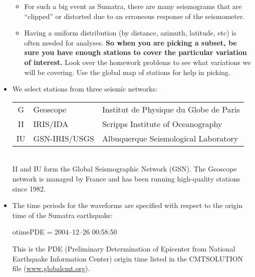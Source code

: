\documentclass[11pt,titlepage,fleqn]{article}
\begin{document}
\begin{itemize}
\begin{itemize}
\item For such a big event as Sumatra, there are many seismograms that are ``clipped'' or distorted due to an erroneous response of the seismometer.

\item Having a uniform distribution (by distance, azimuth, latitude, etc) is often needed for analyses. {\bf So when you are picking a subset, be sure you have enough stations to cover the particular variation of interest.} Look over the homework problems to see what variations we will be covering. Use the global map of stations for help in picking.
\end{itemize}

\item We select stations from three seismic networks: \\

\begin{tabular}{cll}
\hline
G   & Geoscope      & Institut de Physique du Globe de Paris \\
II  & IRIS/IDA      & Scripps Institute of Oceanography \\
IU  & GSN-IRIS/USGS & Albuquerque Seismological Laboratory \\
\hline
\end{tabular} \\

\noindent
II and IU form the Global Seismographic Network (GSN).
The Geoscope network is managed by France and has been running high-quality stations since 1982.

\item The time periods for the waveforms are specified with respect to the origin time of the Sumatra earthquake:

\vspace{0.5cm}
otimePDE = 2004--12--26 00:58:50
\vspace{0.5cm}

\noindent
This is the PDE (Preliminary Determination of Epicenter from National Earthquake Information Center) origin time listed in the CMTSOLUTION file (\url{www.globalcmt.org}).

\end{itemize}


\end{document}
